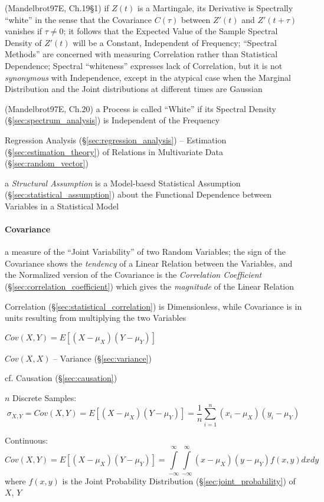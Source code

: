 (Mandelbrot97E, Ch.19\S 1) if $Z(t)$ is a Martingale, its Derivative is
Spectrally ``white'' in the sense that the Covariance $C(\tau)$ between $Z'(t)$
and $Z'(t + \tau)$ vanishes if $\tau \neq 0$; it follows that the Expected Value
of the Sample Spectral Density of $Z'(t)$ will be a Constant, Independent of
Frequency; ``Spectral Methods'' are concerned with measuring Correlation rather
than Statistical Dependence; Spectral ``whiteness'' expresses lack of
Correlation, but it is not \emph{synonymous} with Independence, except in the
atypical case when the Marginal Distribution and the Joint distributions at
different times are Gaussian

(Mandelbrot97E, Ch.20) a Process is called ``White'' if its Spectral Density
(\S\ref{sec:spectrum_analysis}) is Independent of the Frequency

\fist Regression Analysis (\S\ref{sec:regression_analysis}) -- Estimation
(\S\ref{sec:estimation_theory}) of Relations in Multivariate Data
(\S\ref{sec:random_vector})

\fist a \emph{Structural Assumption} is a Model-baesd Statistical Assumption
(\S\ref{sec:statistical_assumption}) about the Functional Dependence between
Variables in a Statistical Model



\paragraph{Covariance}\label{sec:covariance}\hfill

a measure of the ``Joint Variability'' of two Random Variables; the sign of the
Covariance shows the \emph{tendency} of a Linear Relation between the Variables,
and the Normalized version of the Covariance is the \emph{Correlation
Coefficient} (\S\ref{sec:correlation_coefficient}) which gives the
\emph{magnitude} of the Linear Relation

Correlation (\S\ref{sec:statistical_correlation}) is Dimensionless, while
Covariance is in units resulting from multiplying the two Variables

$Cov(X,Y) = E [(X - \mu_X)(Y - \mu_Y)]$

$Cov(X,X)$ -- Variance (\S\ref{sec:variance})

\fist cf. Causation (\S\ref{sec:causation})

$n$ Discrete Samples:
\[
  \sigma_{X,Y} = Cov(X,Y) = E [(X - \mu_X)(Y - \mu_Y)] =
    \frac{1}{n} \sum_{i=1}^n (x_i - \mu_X) (y_i - \mu_Y)
\]

Continuous:
\[
  Cov(X,Y) = E [(X - \mu_X)(Y - \mu_Y)] =
  \int\limits_{-\infty}^{\infty} \int\limits_{-\infty}^{\infty}
  (x - \mu_X) (y - \mu_Y) f(x,y) dx dy
\]
where $f(x,y)$ is the Joint Probability Distribution
(\S\ref{sec:joint_probability}) of $X$, $Y$

